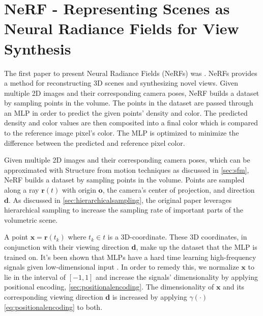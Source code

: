 \section{NeRF - Representing Scenes as Neural Radiance Fields for View Synthesis}

The first paper to present Neural Radiance Fields (NeRFs) was \cite{mildenhall_nerf_2020}. NeRFs provides a method for reconstructing 3D scenes and synthesizing novel views. Given multiple 2D images and their corresponding camera poses, NeRF builds a dataset by sampling points in the volume. The points in the dataset are passed through an MLP in order to predict the given points' density and color. The predicted density and color values are then composited into a final color which is compared to the reference image pixel's color. The MLP is optimized to minimize the difference between the predicted and reference pixel color.


Given multiple 2D images and their corresponding camera poses, which can be approximated with Structure from motion techniques as discussed in \autoref{sec:sfm}, NeRF builds a dataset by sampling points in the volume. Points are sampled along a ray $\pmb{r}(t)$ with origin $\textbf{o}$, the camera's center of projection, and direction $\textbf{d}$. As discussed in \autoref{sec:hierarchicalsampling}, the original paper leverages hierarchical sampling to increase the sampling rate of important parts of the volumetric scene.





A point $\pmb{x} = \pmb{r}(t_k)$ where $t_k \in t$ is a 3D-coordinate. These 3D coordinates, in conjunction with their viewing direction \textbf{d}, make up the dataset that the MLP is trained on. It's been shown that MLPs have a hard time learning high-frequency signals given low-dimensional input \cite{tancik_fourier_2020}. In order to remedy this, we normalize $\textbf{x}$ to lie in the interval of $[-1, 1]$ and increase the signals' dimensionality by applying positional encoding, \autoref{sec:positionalencoding}. The dimensionality of $\pmb{x}$ and its corresponding viewing direction $\pmb{d}$ is increased by applying $\gamma(\cdot)$ \autoref{eq:positionalencoding} to both.

